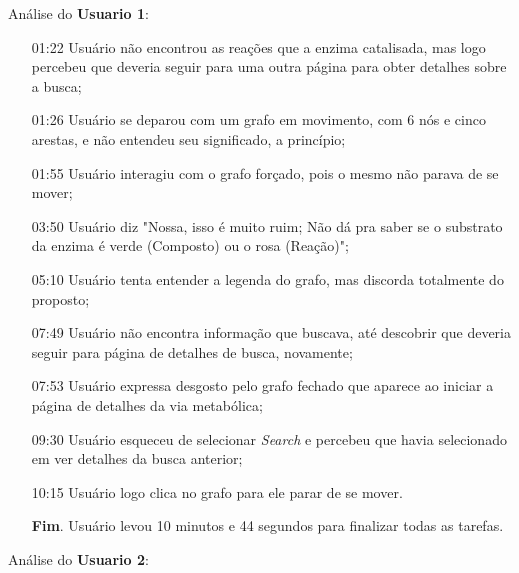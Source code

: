 \indent Análise do \textbf{Usuario 1}:

\begin{itemize}
\item[01:22] Usuário não encontrou as reações que a enzima catalisada, mas logo percebeu que deveria seguir para uma outra página para obter detalhes sobre a busca;
\item[01:26] Usuário se deparou com um grafo em movimento, com 6 nós e cinco arestas, e não entendeu seu significado, a princípio;
\item[01:55] Usuário interagiu com o grafo forçado, pois o mesmo não parava de se mover;
\item[03:50] Usuário diz "Nossa, isso é muito ruim; Não dá pra saber se o substrato da enzima é verde (Composto) ou o rosa (Reação)";
\item[05:10] Usuário tenta entender a legenda do grafo, mas discorda totalmente do proposto;
\item[07:49] Usuário não encontra informação que buscava, até descobrir que deveria seguir para página de detalhes de busca, novamente;
\item[07:53] Usuário expressa desgosto pelo grafo fechado que aparece ao iniciar a página de detalhes da via metabólica;
\item[09:30] Usuário esqueceu de selecionar \textit{Search} e percebeu que havia selecionado em ver detalhes da busca anterior;
\item[10:15] Usuário logo clica no grafo para ele parar de se mover.
\item[ ] \textbf{Fim}. Usuário levou 10 minutos e 44 segundos para finalizar todas as tarefas.
\end{itemize}

\vspace{10mm}
\indent Análise do \textbf{Usuario 2}:

